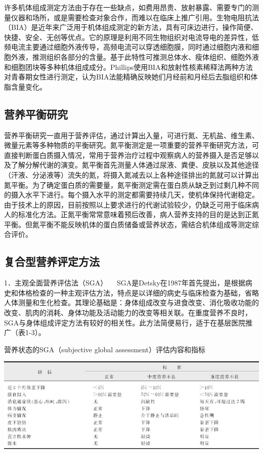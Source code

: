 许多机体组成测定方法由于存在一些缺点，如费用昂贵、放射暴露、需要专门的测量仪器和场所，或是需要检查对象合作，而难以在临床上推广引用。生物电阻抗法（BIA）是近年来广泛用于机体组成测定的新方法，具有可床边进行，操作简便、快捷、安全、无创等优点。它的原理是利用不同生物组织对电流导电的差异性，低频电流主要通过细胞外液传导，高频电流可以穿透细胞膜，同时通过细胞内液和细胞外液，推测组织各部分的含量。基于此特性可推测总体水、瘦体组织、细胞外液和细胞团块等多种机体组成成分。Phillips使用BIA和放射性核素稀释法两种方法对青春期女性进行测定，认为BIA法能精确反映她们月经前和月经后去脂组织和体脂含量变化。

\hypertarget{text00002.htmlux5cux23mllj9}{%
\subsection{营养平衡研究}\label{text00002.htmlux5cux23mllj9}}

营养平衡研究一直用于营养评估，通过计算出入量，可进行氮、无机盐、维生素、微量元素等多种物质的平衡研究。氮平衡测定是一项重要的营养平衡研究方法，可直接判断蛋白质摄入情况，常用于营养治疗过程中观察病人的营养摄入是否足够以及了解分解代谢的演变。氮平衡首先测量人体通过尿液、粪便、皮肤以及其他途径（汗液、分泌液等）流失的氮，将摄入氮减去以上各种途径排出的氮就可以计算出氮平衡。为了确定蛋白质的需要量，氮平衡测定需在蛋白质从缺乏到过剩几种不同的摄入水平下进行。每个摄入水平的测定都需要持续几天，使机体保持代谢稳定。由于技术上的原因，目前按照以上要求进行的代谢试验较少，仍缺乏可用于临床病人的标准化方法。正氮平衡常常意味着预后改善，病人营养支持的目的是达到正氮平衡。但氮平衡不能反映机体的蛋白质储备或营养状态，需结合机体组成等测定综合评价。

\hypertarget{text00002.htmlux5cux23mllj10}{%
\subsection{复合型营养评定方法}\label{text00002.htmlux5cux23mllj10}}

{1．主观全面营养评估法（SGA）}
　SGA是Detsky在1987年首先提出，是根据病史和体格检查的一种主观评估方法，特点是以详细的病史与临床检查为基础，省略人体测量和生化检查。其理论基础是：身体组成改变与进食改变、消化吸收功能的改变、肌肉的消耗、身体功能及活动能力的改变等相关联。在重度营养不良时，SGA与身体组成评定方法有较好的相关性。此方法简便易行，适于在基层医院推广（表1-3）。

\begin{table}[htbp]
\centering
\caption{营养状态的SGA（subjective global assessment）评估内容和指标}
\label{tab1-3}
\includegraphics{./images/Image00005.jpg}
\end{table}

